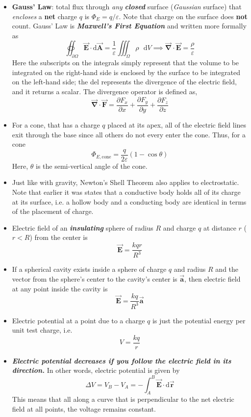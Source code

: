 \documentclass{scrartcl}
\begin{document}
\begin{itemize}
        \item \textbf{Gauss' Law}: total flux through \textit{any} \textbf{\textit{closed}} surface (\textit{Gaussian} surface) that \textit{encloses} a \textbf{net} charge $q$ is $\Phi_E=q/\varepsilon$. Note that charge on the surface does \textbf{not} count. Gauss' Law is \textbf{\textit{Maxwell's First Equation}} and written more formally as \[\boxed{\oiint_{\partial\Omega}\vec{\mathbf E}\cdot\mathrm d\vec{\mathbf A}=\frac1\varepsilon\iiint_\Omega\rho\text{ }\mathrm dV}\implies\boxed{\vec{\mathbf{\nabla}}\cdot\vec{\mathbf E}=\frac\rho\varepsilon}\] Here the subscripts on the integrals simply represent that the volume to be integrated on the right-hand side is enclosed by the surface to be integrated on the left-hand side; the del represents the divergence of the electric field, and it returns a scalar. The divergence operator is defined as, \[\boxed{\vec{\mathbf{\nabla}}\cdot\vec{\mathbf{F}}=\frac{\partial F_x}{\partial x}+\frac{\partial F_y}{\partial y}+\frac{\partial F_z}{\partial z}}\]
        \item For a cone, that has a charge $q$ placed at its apex, all of the electric field lines exit through the base since all others do not every enter the cone. Thus, for a cone \[\boxed{\Phi_{E,\text{cone}}=\frac q{2\varepsilon}\left(1-\cos\theta\right)}\] Here, $\theta$ is the semi-vertical angle of the cone.
        \item Just like with gravity, Newton's Shell Theorem also applies to electrostatic. Note that earlier it was states that a conductive body holds all of its charge at its surface, i.e. a hollow body and a conducting body are identical in terms of the placement of charge.
        \item Electric field of an \textbf{\textit{insulating}} sphere of radius $R$ and charge $q$ at distance $r$ ($r<R$) from the center is \[\boxed{\vec{\mathbf E}=\frac{kqr}{R^3}}\]
        \item If a spherical cavity exists inside a sphere of charge $q$ and radius $R$ and the vector from the sphere's center to the cavity's center is $\vec{\mathbf a}$, then electric field at any point inside the cavity is \[\boxed{\vec{\mathbf E}=\frac{kq}{R^3}\vec{\mathbf a}}\]
        \item Electric potential at a point due to a charge $q$ is just the potential energy per unit test charge, i.e. \[V=\frac{kq}r\]
        \item \textbf{\textit{Electric potential decreases if you follow the electric field in its direction.}} In other words, electric potential is given by \[\boxed{\Delta V=V_B-V_A=-\int_A^B\vec{\mathbf E}\cdot\mathrm d\vec{\mathbf r}}\] This means that all along a curve that is perpendicular to the net electric field at all points, the voltage remains constant.

\end{itemize}
\end{document}
